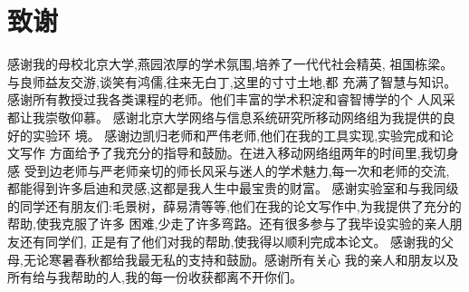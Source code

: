 
\chapter{致谢}
感谢我的母校北京大学,燕园浓厚的学术氛围,培养了一代代社会精英,
祖国栋梁。与良师益友交游,谈笑有鸿儒,往来无白丁,这里的寸寸土地,都
充满了智慧与知识。
  感谢所有教授过我各类课程的老师。他们丰富的学术积淀和睿智博学的个
人风采都让我崇敬仰慕。
  感谢北京大学网络与信息系统研究所移动网络组为我提供的良好的实验环
境。
感谢边凯归老师和严伟老师,他们在我的工具实现,实验完成和论文写作 方面给予了我充分的指导和鼓励。在进入移动网络组两年的时间里,我切身感 受到边老师与严老师亲切的师长风采与迷人的学术魅力,每一次和老师的交流, 都能得到许多启迪和灵感,这都是我人生中最宝贵的财富。
  感谢实验室和与我同级的同学还有朋友们:毛景树，薛易清等等,他们在我的论文写作中,为我提供了充分的帮助,使我克服了许多
困难,少走了许多弯路。还有很多参与了我毕设实验的亲人朋友还有同学们,
正是有了他们对我的帮助,使我得以顺利完成本论文。
  感谢我的父母,无论寒暑春秋都给我最无私的支持和鼓励。感谢所有关心
我的亲人和朋友以及所有给与我帮助的人,我的每一份收获都离不开你们。

